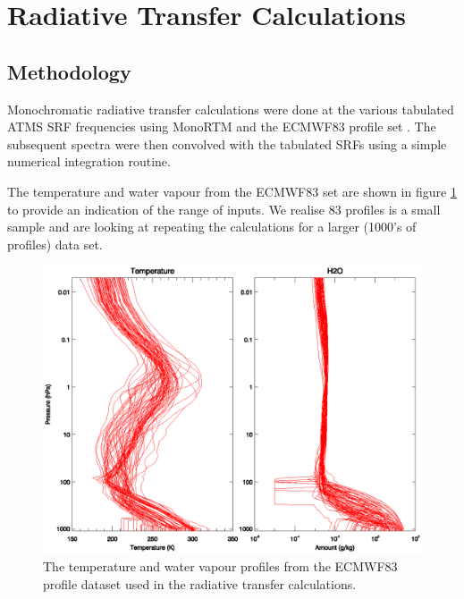\section{Radiative Transfer Calculations}
\label{sec:rt}
\subsection{Methodology}
Monochromatic radiative transfer calculations were done at the various tabulated ATMS SRF frequencies using MonoRTM \cite{Payne_2008,Clough_2005} and the ECMWF83 profile set \cite{Matricardi_ECMWF564,ECMWF_profile_set2}. The subsequent spectra were then convolved with the tabulated SRFs using a simple numerical integration routine.

The temperature and water vapour from the ECMWF83 set are shown in figure \ref{fig:ECMWF83.AtmProfile} to provide an indication of the range of inputs. We realise 83 profiles is a small sample and are looking at repeating the calculations for a larger (1000's of profiles) data set. 

\begin{figure}[htp]
  \centering
  \includegraphics[scale=1]{graphics/atmprofile/ECMWF83.AtmProfile.eps}
  \caption{The temperature and water vapour profiles from the ECMWF83 profile dataset used in the radiative transfer calculations.}
  \label{fig:ECMWF83.AtmProfile}
\end{figure}



